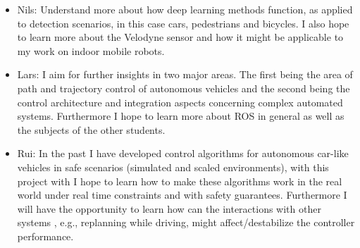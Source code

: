 \documentclass[11pt,a4paper]{article}
\begin{document}
\begin{itemize}
\item 
Nils: Understand more about how deep learning methods function, as applied
to detection scenarios, in this case cars, pedestrians and bicycles.
I also hope to learn more about the Velodyne sensor and how it might
be applicable to my work on indoor mobile robots.

\item
Lars: I aim for further insights in two major areas. The first being the 
area of path and trajectory control of autonomous vehicles and the second being 
the control architecture and integration aspects concerning complex 
automated systems. Furthermore I hope to learn more about ROS in general
as well as the subjects of the other students. 

\item
Rui: In the past I have developed control algorithms for autonomous
car-like vehicles in safe scenarios (simulated and scaled environments), 
with this project with I hope to learn how to make these algorithms work
in the real world under real time constraints and with safety guarantees.
Furthermore I will have the opportunity to learn how can the interactions
with other systems , e.g., replanning while driving, might affect/destabilize
the controller performance.

\newpage
\begin{appendices}

\end{appendices}


\end{itemize}


\end{document}
